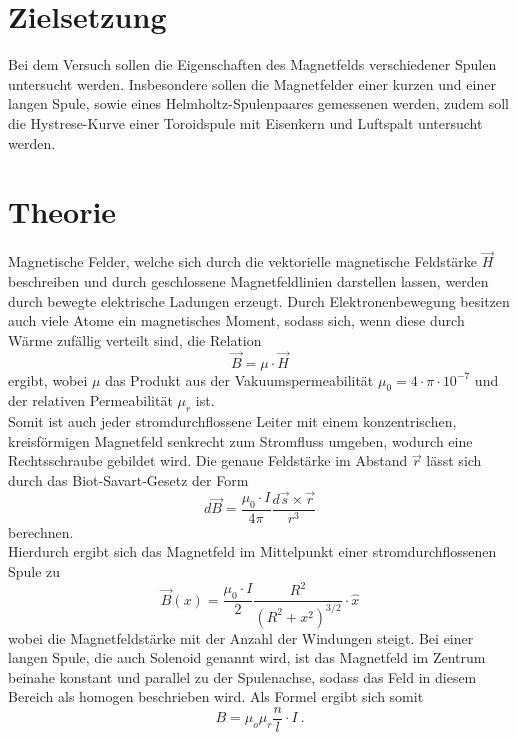 \section{Zielsetzung}
  Bei dem Versuch sollen die Eigenschaften des Magnetfelds verschiedener Spulen untersucht werden.
  Insbesondere sollen die Magnetfelder einer kurzen und einer langen Spule, sowie eines
  Helmholtz-Spulenpaares gemessenen werden, zudem soll die Hystrese-Kurve einer Toroidspule
  mit Eisenkern und Luftspalt untersucht werden.
\section{Theorie}

Magnetische Felder, welche sich durch die vektorielle magnetische Feldstärke
$\vec{H}$ beschreiben und durch geschlossene Magnetfeldlinien darstellen lassen,
werden durch bewegte elektrische Ladungen erzeugt.
Durch Elektronenbewegung besitzen auch viele Atome ein magnetisches Moment, sodass
sich, wenn diese durch Wärme zufällig verteilt sind, die Relation
\begin{equation}
  \vec{B} = \mu \cdot \vec{H}
  \label{eqn:B1}
\end{equation} ergibt, wobei $ \mu $ das Produkt aus der Vakuumspermeabilität
$ \mu_0 = 4 \cdot \pi \cdot 10^{-7}$ und der relativen Permeabilität $ \mu_r $ ist. \\

\noindent Somit ist auch jeder stromdurchflossene Leiter mit einem konzentrischen,
kreisförmigen Magnetfeld senkrecht zum Stromfluss umgeben, wodurch eine Rechtsschraube gebildet wird.
Die genaue Feldstärke im Abstand $\vec{r}$ lässt sich durch das Biot-Savart-Gesetz
der Form
\begin{equation}
  d\vec{B} = \frac{\mu _0 \cdot I}{4\pi} \frac{d \vec{s} \times \vec{r}}{r^3}
  \label{eqn:Biot}
\end{equation}
berechnen. \\
\noindent Hierdurch ergibt sich das Magnetfeld im Mittelpunkt einer stromdurchflossenen Spule zu
\begin{equation}
  \vec{B}(x) = \frac{\mu_0 \cdot I}{2} \frac{R^2}{(R^2+x^2)^{3/2}} \cdot \hat{x}
  \label{eqn:Biot2}
\end{equation}
wobei die Magnetfeldstärke %
mit der Anzahl der Windungen steigt.
Bei einer langen Spule, die auch Solenoid genannt wird, ist das Magnetfeld im
Zentrum beinahe konstant und parallel zu der Spulenachse, sodass das Feld in diesem
Bereich als homogen beschrieben wird.
Als Formel ergibt sich somit
\begin{equation}
  B= \mu_o \mu_r \frac{n}{l} \cdot I \: .
  \label{eqn:langespule}
\end{equation} \\

